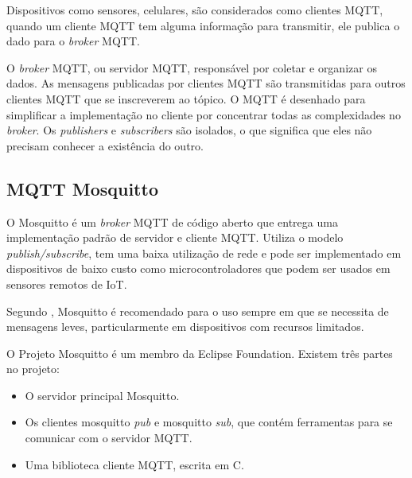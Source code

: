 Dispositivos como sensores, celulares, são considerados como clientes MQTT, quando um cliente MQTT tem alguma informação para transmitir, ele publica o dado para o \textit {broker} MQTT.

O \textit {broker} MQTT, ou servidor MQTT, responsável por coletar e organizar os dados. As mensagens publicadas por clientes MQTT são transmitidas para outros clientes MQTT que se inscreverem ao tópico. O MQTT é desenhado para simplificar a implementação no cliente por concentrar todas as complexidades no \textit {broker}. Os \textit {publishers} e \textit {subscribers} são isolados, o que significa que eles não precisam conhecer a existência do outro.

\subsection{MQTT Mosquitto}

O Mosquitto é um \textit{broker} MQTT de código aberto \cite{Kodali2017} que entrega uma implementação padrão de servidor e cliente MQTT. Utiliza o modelo \textit{publish/subscribe}, tem uma baixa utilização de rede e pode ser implementado em dispositivos de baixo custo como microcontroladores que podem ser usados em sensores remotos de IoT. \cite{Light}

Segundo \cite{Light}, Mosquitto é recomendado para o uso sempre em que se necessita de mensagens leves, particularmente em dispositivos com recursos limitados.

O Projeto Mosquitto é um membro da Eclipse Foundation. Existem três partes no projeto:

\begin{itemize}
	\item O servidor principal Mosquitto.
	\item Os clientes mosquitto \textit{pub} e mosquitto \textit{sub}, que contém ferramentas para se comunicar com o servidor MQTT.
	\item Uma biblioteca cliente MQTT, escrita em C.
\end{itemize}